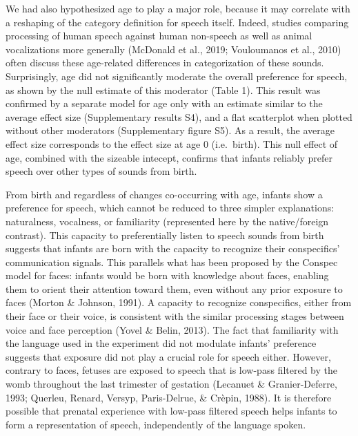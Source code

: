 \documentclass[man]{apa6}
\begin{document}
We had also hypothesized age to play a major role, because it may
correlate with a reshaping of the category definition for speech itself.
Indeed, studies comparing processing of human speech against human
non-speech as well as animal vocalizations more generally (McDonald et
al., 2019; Vouloumanos et al., 2010) often discuss these age-related
differences in categorization of these sounds. Surprisingly, age did not
significantly moderate the overall preference for speech, as shown by
the null estimate of this moderator (Table 1). This result was confirmed
by a separate model for age only with an estimate similar to the average
effect size (Supplementary results S4), and a flat scatterplot when
plotted without other moderators (Supplementary figure S5). As a result,
the average effect size corresponds to the effect size at age 0
(i.e.~birth). This null effect of age, combined with the sizeable
intecept, confirms that infants reliably prefer speech over other types
of sounds from birth.

From birth and regardless of changes co-occurring with age, infants show
a preference for speech, which cannot be reduced to three simpler
explanations: naturalness, vocalness, or familiarity (represented here
by the native/foreign contrast). This capacity to preferentially listen
to speech sounds from birth suggests that infants are born with the
capacity to recognize their conspecifics' communication signals. This
parallels what has been proposed by the Conspec model for faces: infants
would be born with knowledge about faces, enabling them to orient their
attention toward them, even without any prior exposure to faces (Morton
\& Johnson, 1991). A capacity to recognize conspecifics, either from
their face or their voice, is consistent with the similar processing
stages between voice and face perception (Yovel \& Belin, 2013). The
fact that familiarity with the language used in the experiment did not
modulate infants' preference suggests that exposure did not play a
crucial role for speech either. However, contrary to faces, fetuses are
exposed to speech that is low-pass filtered by the womb throughout the
last trimester of gestation (Lecanuet \& Granier-Deferre, 1993; Querleu,
Renard, Versyp, Paris-Delrue, \& Crèpin, 1988). It is therefore possible
that prenatal experience with low-pass filtered speech helps infants to
form a representation of speech, independently of the language spoken.
\end{document}
